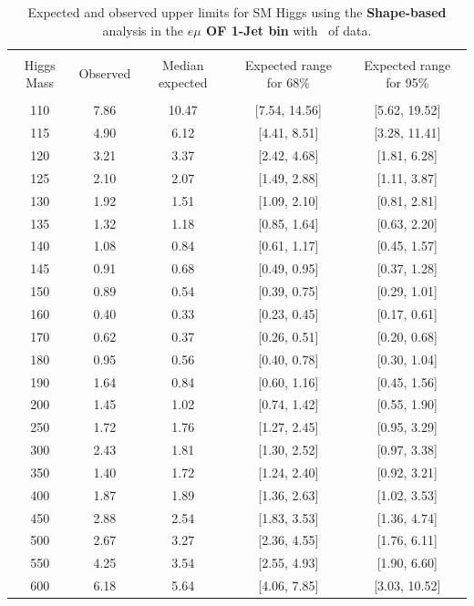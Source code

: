 \begin{table}[hbp!]
\begin{center}
\begin{tabular}{c c c c c}
\hline
\vspace{-3mm} && \\
 Higgs Mass & Observed  & Median expected & Expected range for 68\% & Expected range for 95\%   \\
\vspace{-3mm} && \\
\hline
110 & 7.86 & 10.47 & [7.54, 14.56] & [5.62, 19.52] \\
115 & 4.90 & 6.12 & [4.41, 8.51] & [3.28, 11.41] \\
120 & 3.21 & 3.37 & [2.42, 4.68] & [1.81, 6.28] \\
125 & 2.10 & 2.07 & [1.49, 2.88] & [1.11, 3.87] \\
130 & 1.92 & 1.51 & [1.09, 2.10] & [0.81, 2.81] \\
135 & 1.32 & 1.18 & [0.85, 1.64] & [0.63, 2.20] \\
140 & 1.08 & 0.84 & [0.61, 1.17] & [0.45, 1.57] \\
145 & 0.91 & 0.68 & [0.49, 0.95] & [0.37, 1.28] \\
150 & 0.89 & 0.54 & [0.39, 0.75] & [0.29, 1.01] \\
160 & 0.40 & 0.33 & [0.23, 0.45] & [0.17, 0.61] \\
170 & 0.62 & 0.37 & [0.26, 0.51] & [0.20, 0.68] \\
180 & 0.95 & 0.56 & [0.40, 0.78] & [0.30, 1.04] \\
190 & 1.64 & 0.84 & [0.60, 1.16] & [0.45, 1.56] \\
200 & 1.45 & 1.02 & [0.74, 1.42] & [0.55, 1.90] \\
250 & 1.72 & 1.76 & [1.27, 2.45] & [0.95, 3.29] \\
300 & 2.43 & 1.81 & [1.30, 2.52] & [0.97, 3.38] \\
350 & 1.40 & 1.72 & [1.24, 2.40] & [0.92, 3.21] \\
400 & 1.87 & 1.89 & [1.36, 2.63] & [1.02, 3.53] \\
450 & 2.88 & 2.54 & [1.83, 3.53] & [1.36, 4.74] \\
500 & 2.67 & 3.27 & [2.36, 4.55] & [1.76, 6.11] \\
550 & 4.25 & 3.54 & [2.55, 4.93] & [1.90, 6.60] \\
600 & 6.18 & 5.64 & [4.06, 7.85] & [3.03, 10.52] \\
\hline
\end{tabular}
\caption{Expected and observed upper limits for SM Higgs using the
  {\bf Shape-based} analysis in the {\bf $e\mu$ OF 1-Jet bin} with \intlumiEightTeV\ of data.}
\label{tab:bdtbase_uls_1jof}
\end{center}
\end{table}

